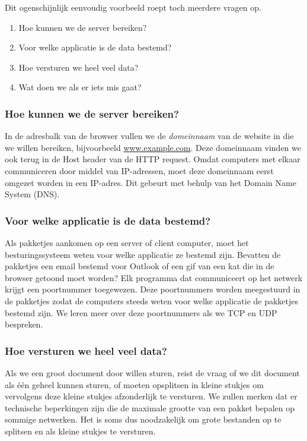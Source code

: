 Dit ogenschijnlijk eenvoudig voorbeeld roept toch meerdere vragen op.
\begin{enumerate}
\item Hoe kunnen we de server bereiken?
\item Voor welke applicatie is de data bestemd?
\item Hoe versturen we heel veel data?
\item Wat doen we als er iets mis gaat?
\end{enumerate}



\subsubsection{Hoe kunnen we de server bereiken?}
In de adresbalk van de browser vullen we de \emph{domeinnaam} van de website in die we willen bereiken, bijvoorbeeld \url{www.example.com}.
Deze domeinnaam vinden we ook terug in de Host header van de HTTP request.
Omdat computers met elkaar communiceren door middel van IP-adressen, moet deze domeinnaam eerst omgezet worden in een IP-adres.
Dit gebeurt met behulp van het Domain Name System (DNS).

\subsubsection{Voor welke applicatie is de data bestemd?}
Als pakketjes aankomen op een server of client computer, moet het besturingssysteem weten voor welke applicatie ze bestemd zijn.
Bevatten de pakketjes een email bestemd voor Outlook of een gif van een kat die in de browser getoond moet worden?
Elk programma dat communiceert op het netwerk krijgt een poortnummer toegewezen.
Deze poortnummers worden meegestuurd in de pakketjes zodat de computers steeds weten voor welke applicatie de pakketjes bestemd zijn.
We leren meer over deze poortnummers als we TCP en UDP bespreken.

\subsubsection{Hoe versturen we heel veel data?}
Als we een groot document door willen sturen, reist de vraag of we dit document als één geheel kunnen sturen, of moeten opsplitsen in kleine stukjes om vervolgens deze kleine stukjes afzonderlijk te versturen.
We zullen merken dat er technische beperkingen zijn die de maximale grootte van een pakket bepalen op sommige netwerken.
Het is soms dus noodzakelijk om grote bestanden op te splitsen en als kleine stukjes te versturen.

